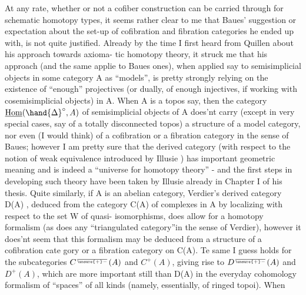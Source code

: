 At any rate,  whether or not a  cofiber construction  can be carried
through for schematic homotopy types,  it seems rather clear to me that
Baues' suggestion or expectation\hand{,} about the set-up of cofibration and
fibration categories he ended up with,  is not quite justified.  Already
by the time  I first heard from Quillen about his approach towards axioma-%
tic homotopy theory,  it struck me that his approach (and the same applie
to Baues ones),   when applied say to semisimplicial objects in some
category A as ``models'',  is pretty strongly relying on the existence of
``enough'' projectives (or dually,  of enough injectives,  if working with
cosemisimplicial objects) in A.  When A is a topos say,  then the
category $\underline{\mathrm{Hom}}(\hand{\Delta}^{\circ},A)$ of semisimplicial objects of A does'nt carry 
(except in very special cases,  say of a totally disconnected topos) a
structure of a  model category,  nor even (I would think) of a
cofibration or a fibration category in the sense of Baues;  however I am
pretty sure that the derived category   (with respect to the
\margin{$\times$} notion of  weak equivalence introduced by Illusie \hand{[\quad]})  has important
geometric meaning and is indeed a ``universe for homotopy theory''  - and
the first steps in developing such theory have been taken by Illusie
already in Chapter I of his thesis.  Quite similarly,  if A is an abelian
category,  Verdier's derived category  D(A) , deduced from the category
C(A) of complexes in A by localizing with respect to the set W of quasi-%
isomorphisms,   does allow for a homotopy formalism (as does any
``triangulated category''in the sense of Verdier),  however it does'nt seem
that this formalism may be deduced from a structure of a cofibration cate
\hand{-}gory or a fibration category on C(A).   Te same I guess holds for the
 subcategories $C^{\over{\unsure{+}}{-}}(A)$ and $C^{+}(A)$,  giving rise to $D^{\over{\unsure{+}}{-}}(A)$ and $D^{+}(A)$,  which
are more important still than D(A) in the everyday cohomology formalism
of ``spaces'' of all kinds (namely,  essentially,  of ringed topoi).  When


